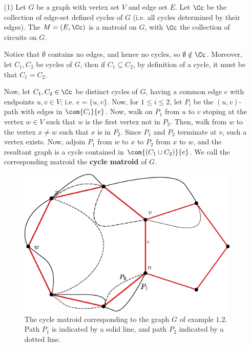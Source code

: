 \begin{example}\label{1.5}
    \begin{enumerate}
        \item[(1)] Let $G$ be a graph with vertex set $V$ and edge set  $E$. Let
            $\Cc$ be the collection of edge-set defined cycles of  $G$  (i.e.
            all cycles determined by their edges). The $M=(E,\Cc)$ is a matroid
            on $G$, with  $\Cc$ the collection of circuits on $G$.

            Notice that $\emptyset$ contains no edges, and hence no cycles, so
            $\emptyset \notin \Cc$. Moreover, let $C_1,C_2$ be cycles of $G$,
            then if  $C_1 \subseteq C_2$, by definition of a cycle, it must be
            that $C_1=C_2$.

            Now, let $C_1,C_2 \in \Cc$ be distinct cycles of $G$, having a
            common edge  $e$ with endpoints  $u,v \in V$; i.e.  $e=\{u,v\}$.
            Now, for $1 \leq i \leq 2$, let  $P_i$ be the  $(u,v)$-path with
            edges in $\com{C_i}{e}$. Now, walk on $P_1$ from $u$ to $v$ stoping
            at the vertex $w \in V$ such that  $w$ is the first vertex not in
            $P_2$. Then, walk from $w$ to the vertex  $x \neq w$ such that $x$
            is in  $P_2$. Since $P_1$ and $P_2$ terminate at $v$, such a vertex
            exists. Now, adjoin  $P_1$ from $w$ to  $x$ to  $P_2$ from $x$ to
            $w$, and the resultant graph is a cycle  contained in  $\com{(C_1
            \cup C_2)}{e}$. We call the corresponding matroid the \textbf{cycle
            matroid} of $G$.

            \begin{figure}[h]
                \centering
                \includegraphics[scale=0.5]{Figures/Chapter1/cycle_matroid.eps}
                \caption{The cycle matroid corresponding to the graph $G$ of
                example $1.2$. Path $P_1$ is indicated by a solid line, and path
                $P_2$ indicated by a dotted line.}
                \label{fig_1.1}
            \end{figure}


\end{enumerate}
\end{example}
